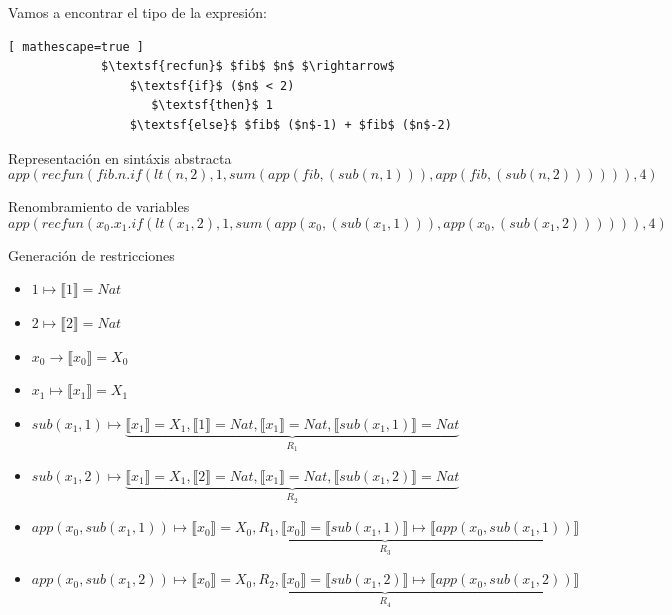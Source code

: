     \begin{exercise}
        Vamos a encontrar el tipo de la expresión:
            \begin{lstlisting}[ mathescape=true ]
             $\textsf{recfun}$ $fib$ $n$ $\rightarrow$ 
                 $\textsf{if}$ ($n$ < 2) 
                    $\textsf{then}$ 1
                 $\textsf{else}$ $fib$ ($n$-1) + $fib$ ($n$-2)
           \end{lstlisting}
        \begin{description}
	 \item Representación en sintáxis abstracta	
 	        $$app(recfun(fib.n.if(lt(n , 2), 1, sum(app(fib, (sub(n,1))),app(fib, (sub(n,2)))))),4)$$
 \bigskip
            \item Renombramiento de variables
                $$app(recfun(x_0.x_1.if(lt(x_1 , 2), 1, sum(app(x_0, (sub(x_1,1))), app(x_0, (sub(x_1,2)))))),4)$$
\bigskip
            \item Generación de restricciones
 \bigskip
            \begin{itemize}
                \item $1 \mapsto  \llbracket 1 \rrbracket = Nat$\\
                \item $2 \mapsto  \llbracket 2 \rrbracket = Nat$\\
                \item $x_0 \to  \llbracket x_0 \rrbracket = X_0$\\
                \item $x_1 \mapsto  \llbracket x_1 \rrbracket = X_1$\\ 
                \item $sub(x_1,1) \mapsto \underbrace{ \llbracket x_1 \rrbracket = X_1,  \llbracket 1 \rrbracket = Nat,  \llbracket x_1 \rrbracket = Nat,  \llbracket sub(x_1,1) \rrbracket = Nat}_{R_1}$
                \item $sub(x_1,2) \mapsto \underbrace{ \llbracket x_1 \rrbracket = X_1,  \llbracket 2 \rrbracket = Nat,  \llbracket x_1 \rrbracket = Nat,  \llbracket sub(x_1,2) \rrbracket = Nat}_{R_2}$
                \item $app(x_0, sub(x_1,1)) \mapsto \underbrace{ \llbracket x_0 \rrbracket = X_0, R_1,  \llbracket x_0 \rrbracket =  \llbracket sub(x_1,1) \rrbracket \mapsto  \llbracket app(x_0, sub(x_1,1)) \rrbracket }_{R_3}$
                \item $app(x_0, sub(x_1,2)) \mapsto \underbrace{ \llbracket x_0 \rrbracket = X_0, R_2,  \llbracket x_0 \rrbracket =  \llbracket sub(x_1,2) \rrbracket \mapsto  \llbracket app(x_0, sub(x_1,2)) \rrbracket }_{R_4}$

\end{itemize}
\end{description}
\end{exercise}
